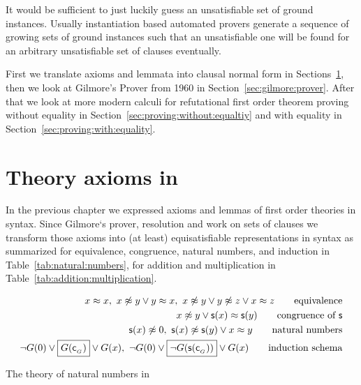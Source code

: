 
It would be sufficient to just luckily guess an unsatisfiable set of ground instances.
Usually instantiation based automated provers generate
a sequence of growing sets of ground instances
such that an unsatisfiable one will be found
for an arbitrary unsatisfiable set of clauses
eventually.

First we translate axioms and lemmata into clausal normal form in Sections~\ref{sec:clausal:normal:form},
then we look at Gilmore's Prover from 1960 in Section~\ref{sec:gilmore:prover}.
After that we look at more modern calculi for refutational first order theorem proving
without equality in Section~\ref{sec:proving:without:equaltiy} and with equality in Section~\ref{sec:proving:with:equality}.


%
%
%

%
%

\section{Theory axioms in \CNF}\label{sec:clausal:normal:form}

In the previous chapter we expressed axioms and lemmas of first order theories in \FOF{} syntax.
Since Gilmore`s prover, resolution and \InstGen{} work on sets of clauses we transform
those axioms into (at least) equisatisfiable representations in \CNF{} syntax
as summarized for equivalence, congruence, natural numbers, and induction in Table~\ref{tab:natural:numbers},
for addition and multiplication in Table~\ref{tab:addition:multiplication}.

\begin{table}[hbt]
	\begin{align*}
	x\mEQ x,\
	x\mNE y\lor y\mEQ x,\
	x\mNE y\lor y\mNE z\lor x\mEQ z
	\tag*{equivalence}
	\\
	x\mNE y\lor \msucc(x)\mEQ\msucc(y)
	\tag*{congruence of \( \msucc \)}
	\\
	\msucc(x) \mNE 0,\
	\msucc(x) \mNE \msucc(y) \lor x \mEQ y
	\tag*{natural numbers}
	\\
	\lnot G(0) \lor \boxed{G(\mc_{_G})} \lor G(x),\
	\lnot G(0) \lor \boxed{\lnot G(\msucc(\mc_{_G}))} \lor G(x)
	\tag*{induction schema}
	\end{align*}
	\caption{The theory of natural numbers in \CNF}\label{tab:natural:numbers}
\end{table}

